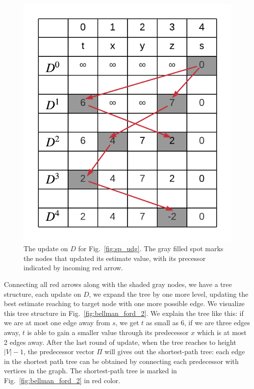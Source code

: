 \documentclass[../main.tex]{subfiles}
\begin{document}
\begin{figure}[!ht]
    \centering
    \includegraphics[width=0.4\columnwidth]{fig/bellman-ford-D (2).png}
    
    \caption{The update on $D$ for Fig.~\ref{fig:sp_udg}. The gray filled spot marks the nodes that updated its estimate value, with its precessor indicated by incoming red arrow.}
    \label{fig:bellman_ford_1}
\end{figure}
Connecting all red arrows along with the shaded gray nodes, we have a tree structure, each update on $D$, we expand the tree by one more level, updating the best estimate reaching to target node with one more possible edge. We visualize this tree structure in Fig.~\ref{fig:bellman_ford_2}. We explain the tree like this: if we are at most one edge away from $s$, we get $t$ as small as $6$, if we are three edges away, $t$ is able to gain a smaller value through its predecessor $x$ which is at most 2 edges away. After the last round of update, when the tree reaches to height $|V|-1$, the predecessor vector $\Pi$ will gives out the shortest-path tree: each edge in the shortest path tree can be obtained by connecting each predecessor with vertices in the graph. The shortest-path tree is marked in Fig.~\ref{fig:bellman_ford_2} in red color.
\end{document}

